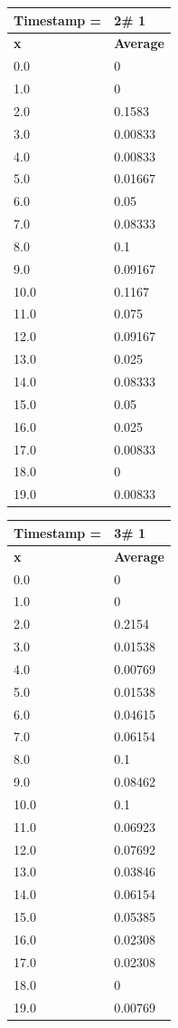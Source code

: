 \begin{tabular}{|l||l|}
\hline
\textbf{Timestamp =} & \textbf{2}\# 1\\\hline
	\textbf{x} & \textbf{Average} \\ \hline
\hline
	0.0 & 0 \\ \hline
	1.0 & 0 \\ \hline
	2.0 & 0.1583 \\ \hline
	3.0 & 0.00833 \\ \hline
	4.0 & 0.00833 \\ \hline
	5.0 & 0.01667 \\ \hline
	6.0 & 0.05 \\ \hline
	7.0 & 0.08333 \\ \hline
	8.0 & 0.1 \\ \hline
	9.0 & 0.09167 \\ \hline
	10.0 & 0.1167 \\ \hline
	11.0 & 0.075 \\ \hline
	12.0 & 0.09167 \\ \hline
	13.0 & 0.025 \\ \hline
	14.0 & 0.08333 \\ \hline
	15.0 & 0.05 \\ \hline
	16.0 & 0.025 \\ \hline
	17.0 & 0.00833 \\ \hline
	18.0 & 0 \\ \hline
	19.0 & 0.00833 \\ \hline
\end{tabular}
\begin{tabular}{|l||l|}
\hline
\textbf{Timestamp =} & \textbf{3}\# 1\\\hline
	\textbf{x} & \textbf{Average} \\ \hline
\hline
	0.0 & 0 \\ \hline
	1.0 & 0 \\ \hline
	2.0 & 0.2154 \\ \hline
	3.0 & 0.01538 \\ \hline
	4.0 & 0.00769 \\ \hline
	5.0 & 0.01538 \\ \hline
	6.0 & 0.04615 \\ \hline
	7.0 & 0.06154 \\ \hline
	8.0 & 0.1 \\ \hline
	9.0 & 0.08462 \\ \hline
	10.0 & 0.1 \\ \hline
	11.0 & 0.06923 \\ \hline
	12.0 & 0.07692 \\ \hline
	13.0 & 0.03846 \\ \hline
	14.0 & 0.06154 \\ \hline
	15.0 & 0.05385 \\ \hline
	16.0 & 0.02308 \\ \hline
	17.0 & 0.02308 \\ \hline
	18.0 & 0 \\ \hline
	19.0 & 0.00769 \\ \hline
\end{tabular}

